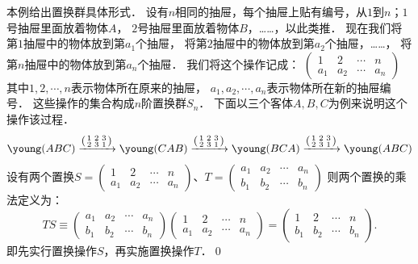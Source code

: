 \begin{example}\label{chtop:exm_ZhiHuanQun}
    本例给出置换群具体形式．
    设有$n$相同的抽屉，每个抽屉上贴有编号，从$1$到$n$；$1$号抽屉里面放着物体$A$，
    $2$号抽屉里面放着物体$B$，……，以此类推．
    现在我们将第$1$抽屉中的物体放到第$a_1$个抽屉，
    将第$2$抽屉中的物体放到第$a_2$个抽屉，……，
    将第$n$抽屉中的物体放到第$a_n$个抽屉．
    我们将这个操作记成：
    $(\begin{smallmatrix}
    	1 &2 &\cdots &n \\  a_1 &a_2 &\cdots &a_n
    \end{smallmatrix} )$
    其中$1, 2, \cdots, n$表示物体所在原来的抽屉，
    $a_1, a_2, \cdots, a_n $表示物体所在新的抽屉编号．
    这些操作的集合构成$n$阶{\kaishu 置换群}$S_n$．
    下面以三个客体$A,B,C$为例来说明这个操作该过程．
    \begin{equation*}
        \young(ABC) \xrightarrow{\left(\begin{smallmatrix}
                1 &2 &3 \\  2 & 3 & 1  \end{smallmatrix} \right)}
        \young(CAB) \xrightarrow{\left(\begin{smallmatrix}
                1 &2 &3 \\  2 & 3 & 1  \end{smallmatrix} \right)}
        \young(BCA) \xrightarrow{\left(\begin{smallmatrix}
                1 &2 &3 \\  2 & 3 & 1  \end{smallmatrix} \right)}
        \young(ABC)
    \end{equation*}
    设有两个置换$S=(\begin{smallmatrix}
    	1 &2 &\cdots &n \\  a_1 &a_2 &\cdots &a_n
    \end{smallmatrix} )$、$T=(\begin{smallmatrix}
    a_1 &a_2 &\cdots &a_n \\ b_1 &b_2 &\cdots &b_n 
    \end{smallmatrix} )$
    则两个置换的乘法定义为：
    \begin{equation*}
    	TS\equiv 
    	\begin{pmatrix} a_1 &a_2 &\cdots &a_n \\ b_1 &b_2 &\cdots &b_n \end{pmatrix}
    	\begin{pmatrix} 1 &2 &\cdots &n \\  a_1 &a_2 &\cdots &a_n \end{pmatrix}
    	=\begin{pmatrix} 1 &2 &\cdots &n \\  b_1 &b_2 &\cdots &b_n \end{pmatrix} .
    \end{equation*}
    即先实行置换操作$S$，再实施置换操作$T$．\qed
\end{example}

